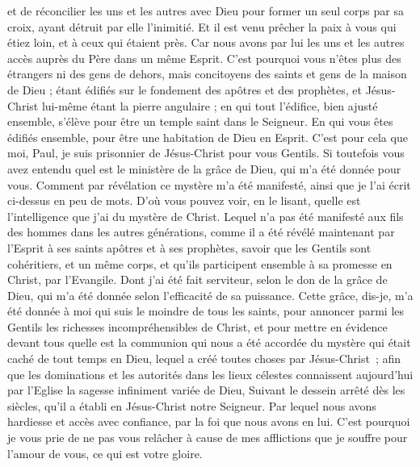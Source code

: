 \begin{multicols}{2}
et de réconcilier les uns et les autres avec Dieu pour former un seul corps par sa croix, ayant détruit par elle l'inimitié.
Et il est venu prêcher la paix à vous qui étiez loin, et à ceux qui étaient près.
Car nous avons par lui les uns et les autres accès auprès du Père dans un même Esprit.
C'est pourquoi vous n'êtes plus des étrangers ni des gens de dehors, mais concitoyens des saints et gens de la maison de Dieu ;
étant édifiés sur le fondement des apôtres et des prophètes, et Jésus-Christ lui-même étant la pierre angulaire ;
en qui tout l’édifice, bien ajusté ensemble, s'élève pour être un temple saint dans le Seigneur.
En qui vous êtes édifiés ensemble, pour être une habitation de Dieu en Esprit.
\VerseOne{}C'est pour cela que moi, Paul, je suis prisonnier de Jésus-Christ pour vous Gentils.
Si toutefois vous avez entendu quel est le ministère de la grâce de Dieu, qui m'a été donnée pour vous.
Comment par révélation ce mystère m'a été manifesté, ainsi que je l'ai écrit ci-dessus en peu de mots.
D'où vous pouvez voir, en le lisant, quelle est l'intelligence que j'ai du mystère de Christ.
Lequel n'a pas été manifesté aux fils des hommes dans les autres générations, comme il a été révélé maintenant par l'Esprit à ses saints apôtres et à ses prophètes,
savoir que les Gentils sont cohéritiers, et un même corps, et qu'ils participent ensemble à sa promesse en Christ, par l'Evangile.
Dont j'ai été fait serviteur, selon le don de la grâce de Dieu, qui m'a été donnée selon l'efficacité de sa puissance.
Cette grâce, dis-je, m'a été donnée à moi qui suis le moindre de tous les saints, pour annoncer parmi les Gentils les richesses incompréhensibles de Christ,
et pour mettre en évidence devant tous quelle est la communion qui nous a été accordée du mystère qui était caché de tout temps en Dieu, lequel a créé toutes choses par Jésus-Christ ;
afin que les dominations et les autorités dans les lieux célestes connaissent aujourd'hui par l'Eglise la sagesse infiniment variée de Dieu,
Suivant le dessein arrêté dès les siècles, qu'il a établi en Jésus-Christ notre Seigneur.
Par lequel nous avons hardiesse et accès avec confiance, par la foi que nous avons en lui.
 C'est pourquoi je vous prie de ne pas vous relâcher à cause de mes afflictions que je souffre pour l'amour de vous, ce qui est votre gloire.

\end{multicols}
